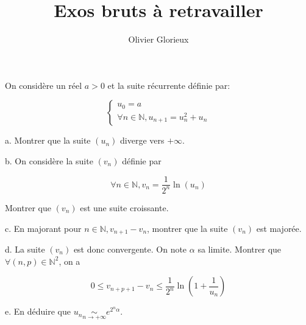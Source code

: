 \documentclass[a4paper, 11pt,reqno]{article}
\author{Olivier Glorieux}
\begin{document}
\title{Exos bruts à retravailler
}
\vspace{-0.5cm}

\begin{exercice}

On considère un réel $a>0$ et la suite récurrente définie par:

$$
\left\{\begin{array}{l}
u_{0}=a \\
\forall n \in \mathbb{N}, u_{n+1}=u_{n}^{2}+u_{n}
\end{array}\right.
$$

a. Montrer que la suite $\left(u_{n}\right)$ diverge vers $+\infty$.

b. On considère la suite $\left(v_{n}\right)$ définie par

$$
\forall n \in \mathbb{N}, v_{n}=\frac{1}{2^{n}} \ln \left(u_{n}\right)
$$

Montrer que $\left(v_{n}\right)$ est une suite croissante.

c. En majorant pour $n \in \mathbb{N}, v_{n+1}-v_{n}$, montrer que la suite $\left(v_{n}\right)$ est majorée.

d. La suite $\left(v_{n}\right)$ est donc convergente. On note $\alpha$ sa limite. Montrer que $\forall(n, p) \in \mathbb{N}^{2}$, on a

$$
0 \leq v_{n+p+1}-v_{n} \leq \frac{1}{2^{n}} \ln \left(1+\frac{1}{u_{n}}\right)
$$

e. En déduire que $u_{n} \underset{n \rightarrow+\infty}{\sim} e^{2^{n} \alpha}$. 


\end{exercice}
\end{document}
